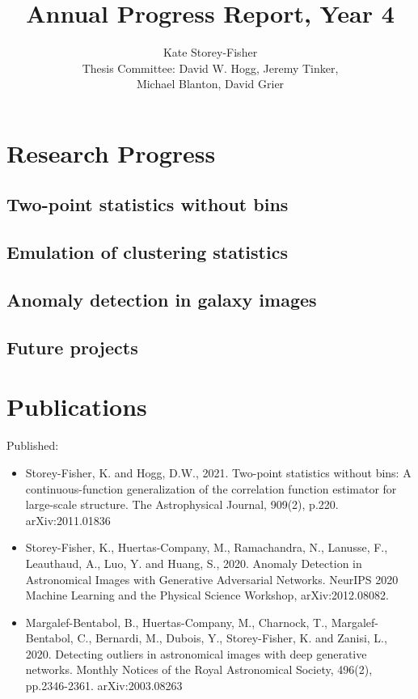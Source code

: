 \documentclass{article}
\title{Annual Progress Report, Year 4}
\author{Kate Storey-Fisher \\
Thesis Committee: David W. Hogg, Jeremy Tinker, \\
Michael Blanton, David Grier
}
\begin{document}
\maketitle


\section{Research Progress}

\subsection{Two-point statistics without bins}

\subsection{Emulation of clustering statistics}

\subsection{Anomaly detection in galaxy images}

\subsection{Future projects}

\section{Publications}

Published:
\begin{itemize}
\item Storey-Fisher, K. and Hogg, D.W., 2021. Two-point statistics without bins: A continuous-function generalization of the correlation function estimator for large-scale structure. The Astrophysical Journal, 909(2), p.220. arXiv:2011.01836
\item Storey-Fisher, K., Huertas-Company, M., Ramachandra, N., Lanusse, F., Leauthaud, A., Luo, Y. and Huang, S., 2020. Anomaly Detection in Astronomical Images with Generative Adversarial Networks. NeurIPS 2020 Machine Learning and the Physical Science Workshop, arXiv:2012.08082.
\item Margalef-Bentabol, B., Huertas-Company, M., Charnock, T., Margalef-Bentabol, C., Bernardi, M., Dubois, Y., Storey-Fisher, K. and Zanisi, L., 2020. Detecting outliers in astronomical images with deep generative networks. Monthly Notices of the Royal Astronomical Society, 496(2), pp.2346-2361. arXiv:2003.08263
\end{itemize}
\end{document}
